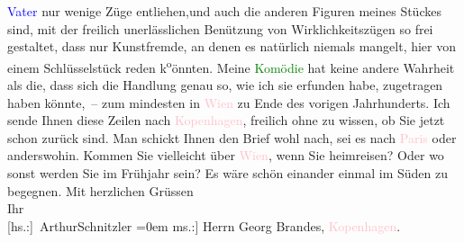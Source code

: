                   \textcolor{blue}{Vater}{} nur wenige Züge
               entliehen,und auch die anderen Figuren meines Stückes sind, mit der freilich
               unerlässlichen Benützung von Wirklichkeitszügen so frei gestaltet, dass nur
               Kunstfremde, an denen es natürlich {\pb}niemals
               mangelt, hier von einem Schlüsselstück reden k\substVorne{}\textsuperscript{o}\substDazwischen{}ö\substHinten{}nnten. Meine \textcolor{green}{Komödie}{} hat
               keine andere Wahrheit als die, dass sich die Handlung genau so, wie ich sie
                  erfunden\strikeout{,} habe, zugetragen haben könnte, – zum
               mindesten in \textcolor{pink}{Wien}{}\ledrightnote{\textcolor{pink}{Wien}} zu Ende des vorigen
               Jahrhunderts.\pend
           \pstart
           Ich sende Ihnen diese Zeilen nach \textcolor{pink}{Kopenhagen}{}\ledrightnote{\textcolor{pink}{Kopenhagen}},
               freilich ohne zu wissen, ob Sie jetzt schon zurück sind. Man schickt Ihnen den Brief
               wohl nach, sei es nach \textcolor{pink}{Paris}{}\ledrightnote{\textcolor{pink}{Paris}} oder anderswohin.
               Kommen Sie vielleicht über \textcolor{pink}{Wien}{}\ledrightnote{\textcolor{pink}{Wien}}, wenn Sie heimreisen?
               Oder wo sonst werden Sie im Frühjahr sein? Es wäre schön einander einmal im Süden zu
               begegnen.\pend
           \pstart
           Mit herzlichen Grüssen{\\[\baselineskip]}Ihr{\\[\baselineskip]}\spacefill\mbox{{[}hs.:{]} ArthurSchnitzler}\pend
           \leftskip=0em{}\pstart
           \noindent{}{[}ms.:{]} Herrn Georg Brandes, \textcolor{pink}{Kopenhagen}{}\ledrightnote{\textcolor{pink}{Kopenhagen}}.\pend
           \endnumbering{}  
      